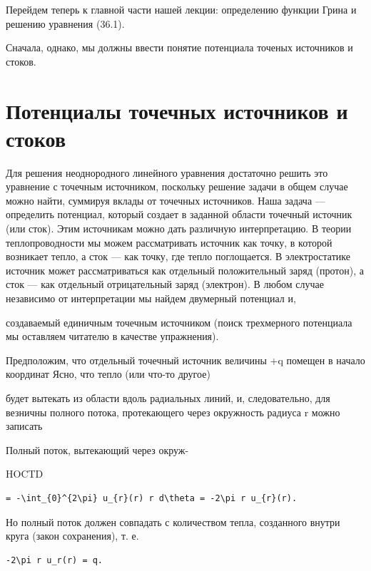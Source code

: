 \documentclass[
  ukrainian,
]{article}
\begin{document}
Перейдем теперь к главной части нашей лекции: определению функции Грина
и решению уравнения (36.1).

Сначала, однако, мы должны ввести понятие потенциала точеных источников
и стоков.

\section{Потенциалы точечных источников и
стоков}\label{ux43fux43eux442ux435ux43dux446ux438ux430ux43bux44b-ux442ux43eux447ux435ux447ux43dux44bux445-ux438ux441ux442ux43eux447ux43dux438ux43aux43eux432-ux438-ux441ux442ux43eux43aux43eux432}

Для решения неоднородного линейного уравнения достаточно решить это
уравнение с точечным источником, поскольку решение задачи в общем случае
можно найти, суммируя вклады от точечных источников. Наша задача ---
определить потенциал, который создает в заданной области точечный
источник (или сток). Этим источникам можно дать различную интерпретацию.
В теории теплопроводности мы можем рассматривать источник как точку, в
которой возникает тепло, а сток --- как точку, где тепло поглощается. В
электростатике источник может рассматриваться как отдельный
положительный заряд (протон), а сток --- как отдельный отрицательный
заряд (электрон). В любом случае независимо от интерпретации мы найдем
двумерный потенциал и,

создаваемый единичным точечным источником (поиск трехмерного потенциала
мы оставляем читателю в качестве упражнения).

Предположим, что отдельный точечный источник величины +q помещен в
начало координат Ясно, что тепло (или что-то другое)

будет вытекать из области вдоль радиальных линий, и, следовательно, для
везничны полного потока, протекающего через окружность радиуса r можно
записать

Полный поток, вытекающий через окруж-

HOCTD

\begin{verbatim}
= -\int_{0}^{2\pi} u_{r}(r) r d\theta = -2\pi r u_{r}(r).
\end{verbatim}

Но полный поток должен совпадать с количеством тепла, созданного внутри
круга (закон сохранения), т. е.

\begin{verbatim}
-2\pi r u_r(r) = q.
\end{verbatim}
\end{document}
